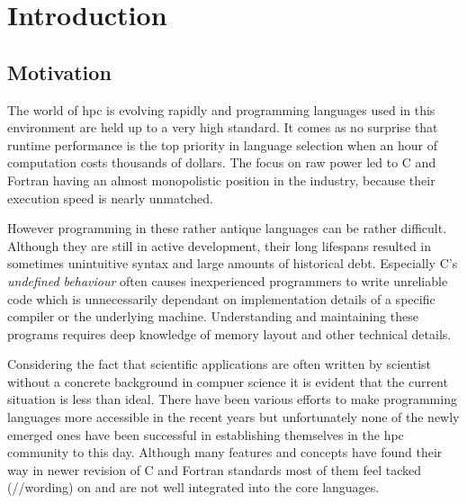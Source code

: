 \chapter{Introduction}
\label{ch:Introduction}


\section{Motivation}
\label{sec:Introduction::Motivation}

The world of \gls{hpc} is evolving rapidly and programming languages used in this environment are held up to a very high standard. It comes as no surprise that runtime performance is the top priority in language selection when an hour of computation costs thousands of dollars.\cite{cost_of_science} The focus on raw power led to C and Fortran having an almost monopolistic position in the industry, because their execution speed is nearly unmatched.

However programming in these rather antique languages can be rather difficult. Although they are still in active development, their long lifespans resulted in sometimes unintuitive syntax and large amounts of historical debt. Especially C's \textit{undefined behaviour} often causes inexperienced programmers to write unreliable code which is unnecessarily dependant on implementation details of a specific compiler or the underlying machine. Understanding and maintaining these programs requires deep knowledge of memory layout and other technical details.

Considering the fact that scientific applications are often written by scientist without a concrete background in compuer science it is evident that the current situation is less than ideal. There have been various efforts to make programming languages more accessible in the recent years but unfortunately none of the newly emerged ones have been successful in establishing themselves in the \gls{hpc} community to this day. Although many features and concepts have found their way in newer revision of C and Fortran standards most of them feel tacked (//wording) on and are not well integrated into the core languages.

